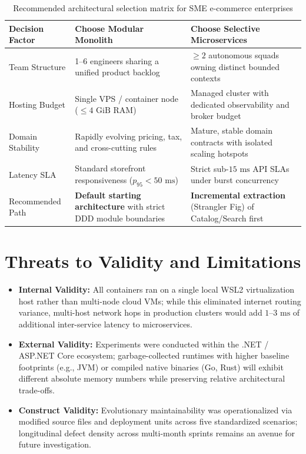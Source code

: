 \begin{table}[h]
  \caption{Recommended architectural selection matrix for SME e-commerce enterprises}
  \label{tab:decision-matrix}
  \centering
  \begin{tabular}{p{3.4cm}p{5.2cm}p{5.2cm}}
    \toprule
    \textbf{Decision Factor} & \textbf{Choose Modular Monolith} & \textbf{Choose Selective Microservices} \\
    \midrule
    Team Structure & 1--6 engineers sharing a unified product backlog & $\ge 2$ autonomous squads owning distinct bounded contexts \\
    Hosting Budget & Single VPS / container node ($\le 4\text{ GiB}$ RAM) & Managed cluster with dedicated observability and broker budget \\
    Domain Stability & Rapidly evolving pricing, tax, and cross-cutting rules & Mature, stable domain contracts with isolated scaling hotspots \\
    Latency SLA & Standard storefront responsiveness ($p_{95} < 50\text{ ms}$) & Strict sub-$15\text{ ms}$ API SLAs under burst concurrency \\
    Recommended Path & \textbf{Default starting architecture} with strict DDD module boundaries & \textbf{Incremental extraction} (Strangler Fig) of Catalog/Search first \\
    \bottomrule
  \end{tabular}
\end{table}

\section{Threats to Validity and Limitations}
\label{sec:threats}
\begin{itemize}[leftmargin=1.5em]
  \item \textbf{Internal Validity:} All containers ran on a single local WSL2 virtualization host rather than multi-node cloud VMs; while this eliminated internet routing variance, multi-host network hops in production clusters would add $1$--$3\text{ ms}$ of additional inter-service latency to microservices.
  \item \textbf{External Validity:} Experiments were conducted within the .NET / ASP.NET Core ecosystem; garbage-collected runtimes with higher baseline footprints (e.g., JVM) or compiled native binaries (Go, Rust) will exhibit different absolute memory numbers while preserving relative architectural trade-offs.
  \item \textbf{Construct Validity:} Evolutionary maintainability was operationalized via modified source files and deployment units across five standardized scenarios; longitudinal defect density across multi-month sprints remains an avenue for future investigation.
\end{itemize}

